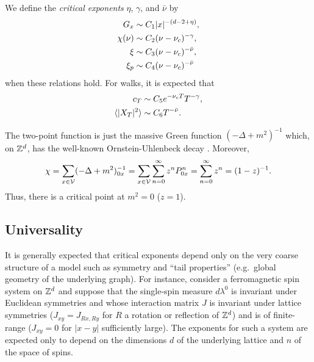 We define the \emph{critical exponents} $\eta$, $\gamma$, and $\bar\nu$ by
\begin{align}
G_x       &\sim C_1 |x|^{-(d - 2 + \eta)}, \\
\chi(\nu) &\sim C_2 (\nu - \nu_c)^{-\gamma}, \\
\xi       &\sim C_3 (\nu - \nu_c)^{-\bar\nu}, \\
\xi_p     &\sim C_4 (\nu - \nu_c)^{-\bar\nu}
\end{align}
when these relations hold. For walks, it is expected that
\begin{align}
c_T                       &\sim C_5 e^{-\nu_c T} T^{-\gamma}, \\
\langle |X_T|^2 \rangle   &\sim C_6 T^{-\bar\nu}.
\end{align}

\begin{example}
The two-point function is just the massive Green function
$(-\Delta + m^2)^{-1}$ which, on ${ {{\mathbb Z}}^d }$, has the well-known Ornstein-Uhlenbeck decay . Moreover,
\begin{equation}
\chi
  =
\sum_{x\in\mathcal{V}} (-\Delta + m^2)^{-1}_{0x}
  =
\sum_{x\in\mathcal{V}} \sum_{n=0}^\infty z^n P^n_{0x}
  =
\sum_{n=0}^\infty z^n
  =
(1 - z)^{-1}.
\end{equation}
Thus, there is a critical point at $m^2 = 0$ ($z = 1$).

\end{example}


\subsection{Universality}

It is generally expected that critical exponents depend only on the very coarse structure of a model such as symmetry and ``tail properties'' (e.g.\ global geometry of the underlying graph). For instance, consider a ferromagnetic spin system on ${ {{\mathbb Z}}^d }$ and suppose that the single-spin measure
$d\lambda^0$ is invariant under Euclidean symmetries and whose interaction matrix $J$ is invariant under lattice symmetries ($J_{xy} = J_{Rx,Ry}$ for $R$ a rotation or reflection of ${ {{\mathbb Z}}^d }$) and is of finite-range ($J_{xy} = 0$ for $|x - y|$ sufficiently large). The exponents for such a system are expected only to depend on the dimensions $d$ of the underlying lattice and $n$ of the space of spins.

